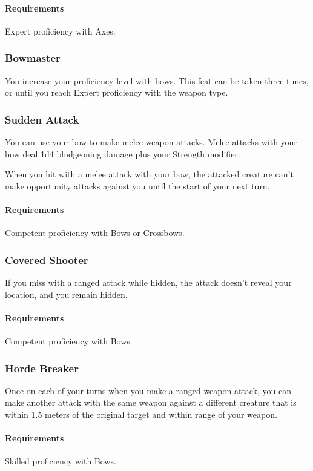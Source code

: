     \paragraph{Requirements} Expert proficiency with Axes.
\subsubsection{Bowmaster} \label{feat::bowmaster}
    You increase your proficiency level with bows.
    This feat can be taken three times, or until you reach Expert proficiency with the weapon type.
\subsubsection{Sudden Attack} \label{feat::suddenattack}
    You can use your bow to make melee weapon attacks.
    Melee attacks with your bow deal 1d4 bludgeoning damage plus your Strength modifier.

    When you hit with a melee attack with your bow, the attacked creature can't make opportunity attacks against you until the start of your next turn.
    \paragraph{Requirements} Competent proficiency with Bows or Crossbows.
\subsubsection{Covered Shooter} \label{feat::coveredshooter}
    If you miss with a ranged attack while hidden, the attack doesn't reveal your location, and you remain hidden.
    \paragraph{Requirements} Competent proficiency with Bows.
\subsubsection{Horde Breaker} \label{feat::hordebreaker}
    Once on each of your turns when you make a ranged weapon attack, you can make another attack with the same weapon against a different creature that is within 1.5 meters of the original target and within range of your weapon.
    \paragraph{Requirements} Skilled proficiency with Bows.
